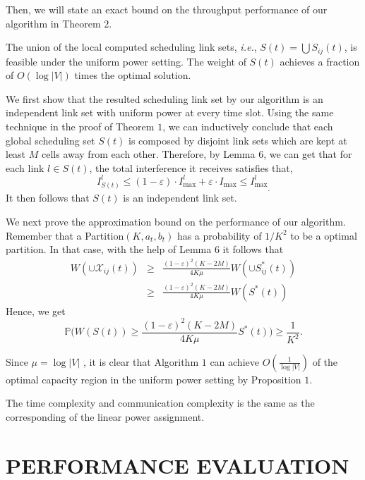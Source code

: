 \documentclass[journal]{IEEEtran}
\begin{document}
Then, we will state an exact bound on the throughput performance of our algorithm in Theorem $2$.
\begin{theorem}
\label{theorem2}
The union of the local computed scheduling link sets, \emph{i.e.},
$S(t)=\bigcup S_{ij}(t)$,  is feasible under the uniform power setting. The weight of $S(t)$ achieves a fraction of $O(\log|V| ) $ times the optimal solution.
\end{theorem}
\begin{IEEEproof}
We first show that the resulted scheduling link set by our algorithm is an independent link set with uniform power at every time slot.
 Using the same technique in the proof of Theorem $1$, we can inductively conclude that each global scheduling set $S(t)$ is
 composed by disjoint link sets which are kept at least $M$ cells away from each other. Therefore, by Lemma $6$, we can get that
 for each link $l \in S(t)$, the total interference it receives satisfies that,
 \begin{equation}
    {I_{S(t)}^l \le (1-\varepsilon) \cdot I_{\max}^l + \varepsilon \cdot I_{\max} \le I_{\max}^l}_{\mbox{.}}
 \end{equation}
It then follows that $S(t)$ is an independent link set.

We next prove the approximation bound on the performance of our algorithm. Remember that a Partition$(K, a_t, b_t)$ has a probability of $1/K^2$ to be a optimal partition. In that case, with the help of Lemma $6$ it follows that
{\small{\begin{eqnarray}
 W(\cup \mathcal{X}_{ij} (t) ) &\ge&  \frac{(1-\varepsilon)^2 (K-2M)}{4K\mu} W( \cup{ S_{ij}^*(t) } ) \\
       &\ge&  \frac{(1-\varepsilon)^2 (K-2M)}{4K\mu}W(S^*(t))
\end{eqnarray}}}
Hence, we get
{\small{
\begin{equation}
    \mathbb{P}\big( W(S(t)) \ge  \frac{(1-\varepsilon)^2 (K-2M)}{4K\mu} S^*(t) \big) \ge \frac{1}{K^2}.
\end{equation}}}

Since $\mu = \log |V|$ , it is clear that Algorithm $1$ can achieve $O(\frac{1}{\log |V|})$ of the optimal capacity region in the uniform power setting by Proposition $1$.
\end{IEEEproof}

The time complexity and communication complexity is the same as the corresponding of the linear power assignment.
\section{PERFORMANCE EVALUATION}
\end{document}
